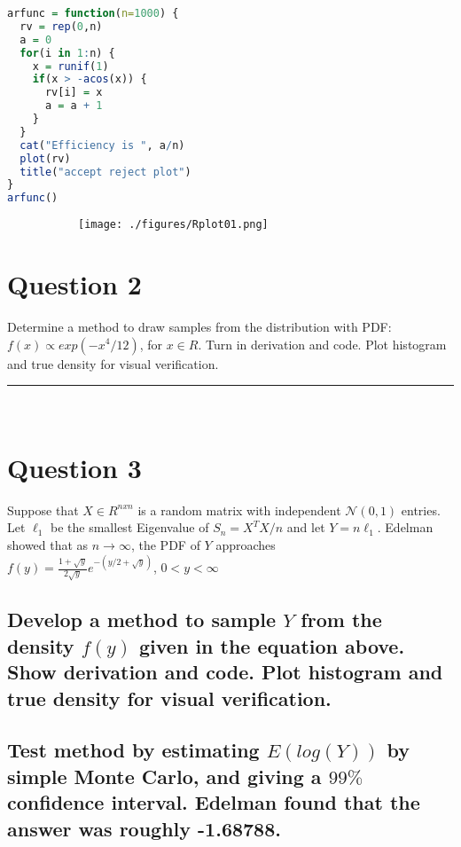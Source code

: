 \documentclass[20pt]{article} %
\begin{document}
\begin{lstlisting}[language=R]
arfunc = function(n=1000) {
  rv = rep(0,n)
  a = 0
  for(i in 1:n) {
    x = runif(1)
    if(x > -acos(x)) {
      rv[i] = x
      a = a + 1
    }
  }
  cat("Efficiency is ", a/n)  
  plot(rv)
  title("accept reject plot")
}
arfunc()
\end{lstlisting}

\begin{figure}[!htbp]
  	\centering
   	\begin{subfigure}[p]{0.8\linewidth}
    	\texttt{[image: ./figures/Rplot01.png]}
   	\end{subfigure}
\end{figure} 

\section{Question 2}
Determine a method to draw samples from the distribution with PDF: $f(x) \propto exp(-x^{4} / 12)$, for $x \in \!R$.  Turn in derivation and code. Plot histogram and true density for visual verification. \\ \noindent\rule{2cm}{0.4pt} \\


\section{Question 3}
Suppose that $X \in \!R^{nxn}$ is a random matrix with independent $\mathcal{N}(0,1)$ entries. Let $\ell_1$ be the smallest Eigenvalue of $S_n = X^{T}X/n$ and let $Y = n\ell_1$.  Edelman showed that as $n \rightarrow \infty$, the PDF of $Y$ approaches \\ 
{\Large $f(y) = \frac{1+\sqrt{y}}{2\sqrt{y}}e^{-(y/2 + \sqrt{y})}$, $0<y<\infty$ } 
\subsection{Develop a method to sample $Y$ from the density $f(y)$ given in the equation above. Show derivation and code. Plot histogram and true density for visual verification.}

\subsection{Test method by estimating $\!E(log(Y))$ by simple Monte Carlo, and giving a $99\%$ confidence interval. Edelman found that the answer was roughly -1.68788.}
\end{document}
